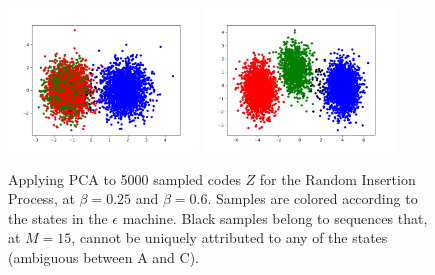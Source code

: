 \documentclass[11pt,letterpaper]{article}
\begin{document}
\begin{figure}
\includegraphics[width=0.45\textwidth]{cryptfig/foo_pca_2.png}
\includegraphics[width=0.45\textwidth]{cryptfig/foo_pca_3.png}
	\caption{Applying PCA to 5000 sampled codes $Z$ for the Random Insertion Process, at $\beta = 0.25$ and $\beta = 0.6$. Samples are colored according to the states in the $\epsilon$ machine. Black samples belong to sequences that, at $M=15$, cannot be uniquely attributed to any of the states (ambiguous between A and C).}\label{fig:latent}
\end{figure}
\end{document}
